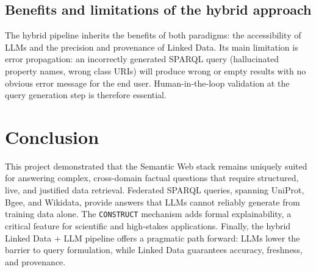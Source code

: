 \documentclass[12pt,a4paper]{article}
\begin{document}
\subsection{Benefits and limitations of the hybrid approach}
The hybrid pipeline inherits the benefits of both paradigms: the accessibility
of LLMs and the precision and provenance of Linked Data.
Its main limitation is error propagation: an incorrectly generated SPARQL query
(hallucinated property names, wrong class URIs) will produce wrong or empty
results with no obvious error message for the end user.
Human-in-the-loop validation at the query generation step is therefore
essential.

\newpage
\section{Conclusion}
\label{sec:conclusion}
This project demonstrated that the Semantic Web stack remains uniquely suited
for answering complex, cross-domain factual questions that require structured,
live, and justified data retrieval.
Federated SPARQL queries, spanning UniProt, Bgee, and Wikidata, provide answers
that LLMs cannot reliably generate from training data alone.
The \texttt{CONSTRUCT} mechanism adds formal explainability, a critical feature
for scientific and high-stakes applications.
Finally, the hybrid Linked Data + LLM pipeline offers a pragmatic path forward:
LLMs lower the barrier to query formulation, while Linked Data guarantees
accuracy, freshness, and provenance.
\end{document}
